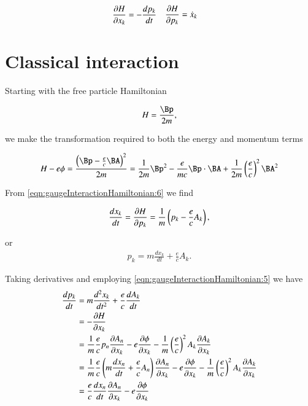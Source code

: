 \begin{subequations}
\begin{align} \label{eqn:gaugeInteractionHamiltonian:5}
\PD{x_k}{H} &= - \frac{d p_k}{dt}
\end{align}
\begin{align} \label{eqn:gaugeInteractionHamiltonian:6}
\PD{p_k}{H} &= \xdot_k
\end{align}
\end{subequations}

\section{Classical interaction}

Starting with the free particle Hamiltonian

\begin{align}\label{eqn:gaugeInteractionHamiltonian:20}
H = \frac{\Bp}{2m},
\end{align}

we make the transformation required to both the energy and momentum terms

\begin{align}\label{eqn:gaugeInteractionHamiltonian:21}
H - e\phi = \frac{\left(\Bp - \frac{e}{c} \BA\right)^2 }{2m} = \inv{2m} \Bp^2 - \frac{e}{m c} \Bp \cdot \BA + \inv{2m} \left(\frac{e}{c}\right)^2 \BA^2 
\end{align}

From \ref{eqn:gaugeInteractionHamiltonian:6} we find

\begin{align}\label{eqn:gaugeInteractionHamiltonian:22}
\frac{d x_k}{dt} = \PD{p_k}{H} = \inv{m} \left( p_k - \frac{e}{c} A_k \right),
\end{align}

or
\begin{align}\label{eqn:gaugeInteractionHamiltonian:23}
p_k = m \frac{d x_k}{dt} + \frac{e}{c} A_k.
\end{align}

Taking derivatives and employing \ref{eqn:gaugeInteractionHamiltonian:5} we have
\begin{align*}
\frac{d p_k}{dt} 
&= m \frac{d^2 x_k}{dt^2} + \frac{e}{c} \frac{d A_k}{dt}  \\
&= -\PD{x_k}{H} \\
&=
\inv{m} \frac{e}{c} p_n \PD{x_k}{A_n} - e \PD{x_k}{\phi}
- \inv{m} \left(\frac{e}{c}\right)^2 A_k \PD{x_k}{A_k} \\
&=
\inv{m} \frac{e}{c} \left(
m \frac{d x_n}{dt} + \frac{e}{c} A_n
\right)
\PD{x_k}{A_n}
 - e \PD{x_k}{\phi}
- \inv{m} \left(\frac{e}{c}\right)^2 A_k \PD{x_k}{A_k} \\
&=
\frac{e}{c} \frac{d x_n}{dt}
\PD{x_k}{A_n}
 - e \PD{x_k}{\phi}
\end{align*}

